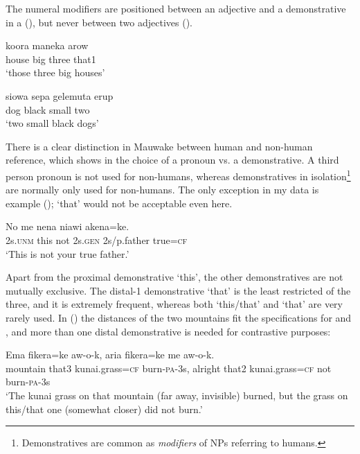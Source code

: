 The numeral modifiers are positioned between an adjective and a demonstrative in a  (), but never between two adjectives ().

\ea%
\label{ex:x631}
\gll koora maneka arow  \\
house big three that1\\
\glt`those three big houses'
\z

\ea%
\label{ex:x632}
\gll siowa sepa gelemuta erup \\
dog black small two\\
\glt`two small black dogs'
\z

There is a clear distinction in Mauwake between human and non-human reference, which shows in the choice of a pronoun vs. a demonstrative. A third person pronoun is not used for non-humans, whereas demonstratives in isolation\footnote{Demonstratives are common as \textit{modifiers} of NPs referring to humans.} are normally only used for non-humans. The only exception in my data is example ();  `that' would not be acceptable even here.

\ea%
\label{ex:x633}
\gll No{\footnotemark}  me nena niawi akena=ke. \\
2s.\textsc{unm} this not 2s.\textsc{gen} 2s/p.father true=\textsc{cf}\\
\glt`This is not your true father.'
\z


Apart from the proximal demonstrative  `this', the other demonstratives are not mutually exclusive. The distal-1 demonstrative  `that' is the least restricted of the three, and it is extremely frequent, whereas both  `this/that' and  `that' are very rarely used. In () the distances of the two mountains fit the specifications for  and  , and more than one distal demonstrative is needed for contrastive purposes:

\ea%
\label{ex:x1749}
\gll Ema  fikera=ke aw-o-k, aria  fikera=ke me aw-o-k.\\
mountain that3 kunai.grass=\textsc{cf} burn-\textsc{pa}-3s, alright that2 kunai.grass=\textsc{cf} not burn-\textsc{pa}-3s\\
\glt`The kunai grass on that mountain (far away, invisible) burned, but the grass on this/that one (somewhat closer) did not burn.'
\z

